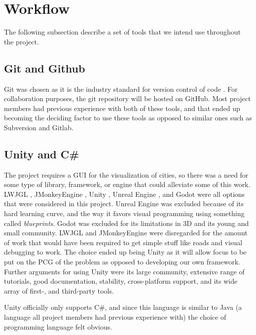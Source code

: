 \section{Workflow}


The following subsection describe a set of tools that we intend use throughout the project.

\subsection{Git and Github}
Git was chosen as it is the industry standard for version control of code \cite{git_industry_standard}.
For collaboration purposes, the git repository will be hosted on GitHub.
Most project members had previous experience with both of these tools, and that ended up becoming the deciding factor to use these tools as opposed to similar ones such as Subversion and Gitlab.

\subsection{Unity and C\#}
The project requires a GUI for the visualization of cities, so there was a need for some type of library, framework, or engine that could alleviate some of this work.
LWJGL \cite{lwjgl}, JMonkeyEngine \cite{jmonkey}, Unity \cite{unity}, Unreal Engine \cite{unreal}, and Godot \cite{godot} were all options that were considered in this project.
Unreal Engine was excluded because of its hard learning curve, and the way it favors visual programming using something called \textit{blueprints}.
Godot was excluded for its limitations in 3D and its young and small community.
LWJGL and JMonkeyEngine were disregarded for the amount of work that would have been required to get simple stuff like roads and visual debugging to work.
The choice ended up being Unity as it will allow focus to be put on the PCG of the problem as opposed to developing our own framework.
Further arguments for using Unity were its large community, extensive range of tutorials, good documentation, stability, cross-platform support, and its wide array of first-, and third-party tools.

Unity officially only supports C\#, and since this language is similar to Java (a language all project members had previous experience with) the choice of programming language felt obvious.
